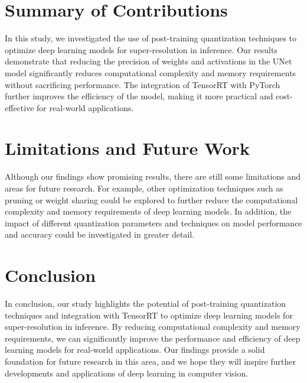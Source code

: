 \label{chap:Conclusions}

\section{Summary of Contributions}
In this study, we investigated the use of post-training quantization techniques to optimize deep learning models for super-resolution in inference. Our results demonstrate that reducing the precision of weights and activations in the UNet model significantly reduces computational complexity and memory requirements without sacrificing performance. The integration of TensorRT with PyTorch further improves the efficiency of the model, making it more practical and cost-effective for real-world applications.

\section{Limitations and Future Work}
Although our findings show promising results, there are still some limitations and areas for future research. For example, other optimization techniques such as pruning or weight sharing could be explored to further reduce the computational complexity and memory requirements of deep learning models. In addition, the impact of different quantization parameters and techniques on model performance and accuracy could be investigated in greater detail.

\section{Conclusion}
In conclusion, our study highlights the potential of post-training quantization techniques and integration with TensorRT to optimize deep learning models for super-resolution in inference. By reducing computational complexity and memory requirements, we can significantly improve the performance and efficiency of deep learning models for real-world applications. Our findings provide a solid foundation for future research in this area, and we hope they will inspire further developments and applications of deep learning in computer vision.

